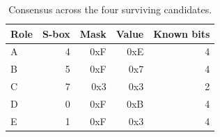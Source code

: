 \begin{table}[t]
\centering
\caption{Consensus across the four surviving candidates.}
\label{tab:s2-consensus}
\begin{tabular}{lrrrr}
\toprule
Role & S-box & Mask & Value & Known bits \\
\midrule
A & 4 & 0xF & 0xE & 4 \\
B & 5 & 0xF & 0x7 & 4 \\
C & 7 & 0x3 & 0x3 & 2 \\
D & 0 & 0xF & 0xB & 4 \\
E & 1 & 0xF & 0x3 & 4 \\
\bottomrule
\end{tabular}
\end{table}
